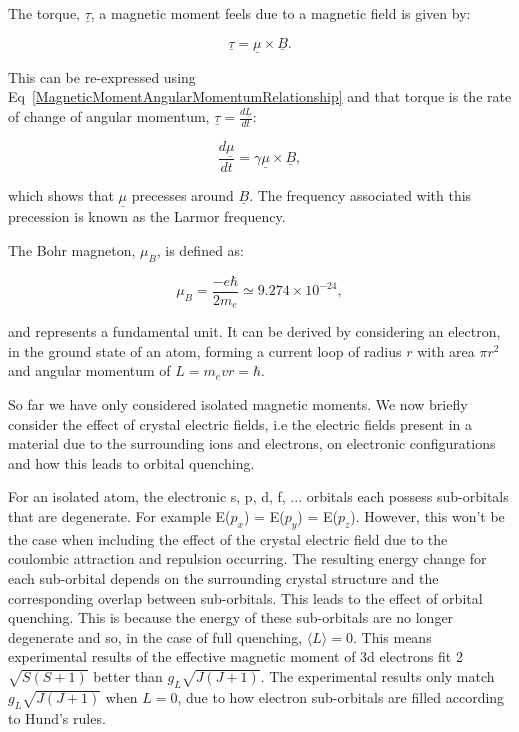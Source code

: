 \noindent The torque, $\underline{\tau}$, a magnetic moment feels due to a magnetic field is given by:

\begin{equation}
    \underline{\tau} = \underline{\mu} \times \underline{B}.
    \label{MagneticMomentTorque}
\end{equation}

\noindent This can be re-expressed using Eq~\ref{MagneticMomentAngularMomentumRelationship} and that torque is the rate of change of angular momentum, $\underline{\tau} = \frac{d \underline{L}}{dt}$:

\begin{equation}
    \frac{d\underline{\mu}}{dt} = \gamma \underline{\mu} \times \underline{B},
    \label{RateChangeMagneticMoment}
\end{equation}

\noindent which shows that $\underline{\mu}$ precesses around $\underline{B}$. The frequency associated with this precession is known as the Larmor frequency.

\noindent The Bohr magneton, $\mu_B$, is defined as:

\begin{equation}
    \mu_B = \frac{-e \hbar}{2m_e} \simeq 9.274 \times 10^{-24},
    \label{BohrMagneton}
\end{equation}

\noindent and represents a fundamental unit. It can be derived by considering an electron, in the ground state of an atom, forming a current loop of radius $r$ with area $\pi r^2$ and angular momentum of $L = m_e v r = \hbar$.

\noindent So far we have only considered isolated magnetic moments. We now briefly consider the effect of crystal electric fields, i.e the electric fields present in a material due to the surrounding ions and electrons, on electronic configurations and how this leads to orbital quenching.

\noindent For an isolated atom, the electronic s, p, d, f, ... orbitals each possess sub-orbitals that are degenerate. For example E($p_x$) = E($p_y$) = E($p_z$). However, this won't be the case when including the effect of the crystal electric field due to the coulombic attraction and repulsion occurring. The resulting energy change for each sub-orbital depends on the surrounding crystal structure and the corresponding overlap between sub-orbitals. This leads to the effect of orbital quenching. This is because the energy of these sub-orbitals are no longer degenerate and so, in the case of full quenching, $\langle L \rangle = 0$. This means experimental results of the effective magnetic moment of 3d electrons fit 2$\sqrt{S(S + 1)}$ better than $g_L\sqrt{J(J + 1)}$. The experimental results only match $g_L\sqrt{J(J + 1)}$ when $L = 0$, due to how electron sub-orbitals are filled according to Hund's rules.


